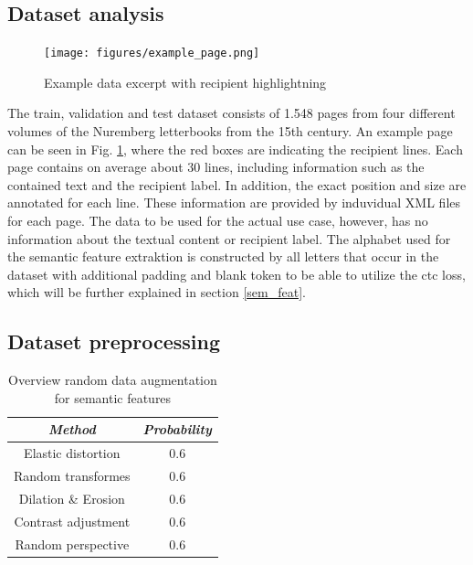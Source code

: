 \documentclass[conference]{IEEEtran}
\begin{document}
\subsection{Dataset analysis}

\begin{figure}[htbp]
    \centering
    \texttt{[image: figures/example\_page.png]}
    \caption{Example data excerpt with recipient highlightning}
    \label{example}
\end{figure}

The train, validation and test dataset consists of 1.548 pages from four different volumes of the Nuremberg letterbooks from the 15th century. An example page can be seen in Fig. \ref{example}, where the red boxes are indicating the recipient lines. Each page contains on average about 30 lines, including information such as the contained text and the recipient label. In addition, the exact position and size are annotated for each line. These information are provided by induvidual XML files for each page. The data to be used for the actual use case, however, has no information about the textual content or recipient label.
The alphabet used for the semantic feature extraktion is constructed by all letters that occur in the dataset with additional padding and blank token to be able to utilize the ctc loss, which will be further explained in section \ref{sem_feat}.

\subsection{Dataset preprocessing}

\begin{table}[htbp]
\caption{Overview random data augmentation for semantic features}
\begin{center}
\begin{tabular}{|c|c|}
\hline
\textbf{\textit{Method}} & \textbf{\textit{Probability}}  \\
\hline
Elastic distortion \cite{yousef2020origaminet} & 0.6 \\
\hline
Random transformes \cite{yousef2020origaminet} & 0.6 \\
\hline
Dilation \& Erosion & 0.6 \\
\hline
Contrast adjustment & 0.6 \\
\hline
Random perspective \cite{NEURIPS2019_9015} & 0.6 \\
\hline
\end{tabular}
\label{data_aug}
\end{center}
\end{table}
\end{document}
